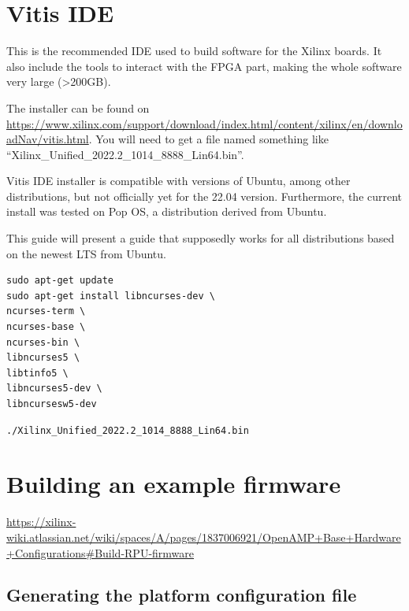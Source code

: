 \documentclass[10pt]{article}
\begin{document}
\section{Vitis IDE}
\label{sec:vitis-ide}
This is the recommended IDE used to build software for the Xilinx boards.
It also include the tools to interact with the FPGA part, making the whole
software very large (>200GB).

The installer can be found on \href{Xilinx download page}{https://www.xilinx.com/support/download/index.html/content/xilinx/en/downloadNav/vitis.html}. You will need to get
a file named something like ``Xilinx\_Unified\_2022.2\_1014\_8888\_Lin64.bin''.

Vitis IDE installer is compatible with versions of Ubuntu, among other distributions,
but not officially yet for the 22.04 version.
Furthermore, the current install was tested on Pop OS, a distribution derived from Ubuntu.

This guide will present a guide that supposedly works for all distributions based on the newest
LTS from Ubuntu.

\begin{tcolorbox}
\begin{verbatim}
sudo apt-get update
sudo apt-get install libncurses-dev \
ncurses-term \
ncurses-base \
ncurses-bin \
libncurses5 \
libtinfo5 \
libncurses5-dev \
libncursesw5-dev
\end{verbatim}
\end{tcolorbox}

\begin{tcolorbox}
\begin{verbatim}
./Xilinx_Unified_2022.2_1014_8888_Lin64.bin
\end{verbatim}
\end{tcolorbox}


\section{Building an example firmware}
\label{sec:bulding-an-example}
\href{Xilinx documentation about building a demo firmware}{https://xilinx-wiki.atlassian.net/wiki/spaces/A/pages/1837006921/OpenAMP+Base+Hardware+Configurations\#Build-RPU-firmware}

\subsection{Generating the platform configuration file}
\label{sec:gener-platf-conf}
\end{document}
